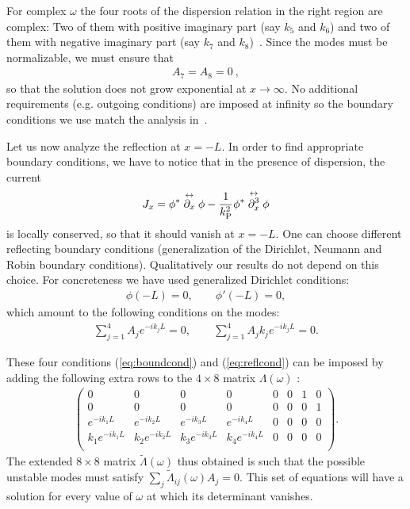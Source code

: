 \documentclass[11pt,a4paper]{article}
\begin{document}
For complex $\omega$ the four roots of the dispersion relation in the right region are complex: Two of them with positive imaginary part (say $k_5$ and $k_6$) and two of them with negative imaginary part (say $k_7$ and $k_8$)~\cite{garay-PRA}. Since the modes must be normalizable, we must ensure that 
\begin{align}
A_7=A_8=0~,
\label{eq:boundcond}
\end{align}
so that the solution does not grow exponential at $x\to\infty$. No additional requirements (e.g. outgoing conditions) are imposed at infinity  so 
the boundary conditions we use match the analysis in~\cite{macher-parentani,garay-PRA,finazzi-parentani2}. 


Let us now analyze the reflection at $x=-L$. In order to find appropriate boundary conditions, we have to notice that in the presence of dispersion, the current
\begin{align}
J_x = \phi^* \stackrel{\leftrightarrow}{\partial_x} \phi -
{1 \over k_\text{P}^2} \phi^* \stackrel{\leftrightarrow}{\partial^3_x} \phi
\end{align}
is locally conserved, so that it should vanish at $x=-L$.  
One can choose different reflecting boundary conditions (generalization of the Dirichlet, Neumann and Robin boundary conditions).
Qualitatively our results do not depend on this choice. For concreteness we have used generalized Dirichlet conditions: 
\begin{align}
\phi(-L)=0,\qquad \phi'(-L)=0,
\end{align}
which amount to the following conditions on the modes:
\begin{align}
\sum_{j=1}^4A_j e^{-ik_jL}=0,
\qquad
\sum_{j=1}^4A_jk_j e^{-ik_jL}=0.
\label{eq:reflcond}
\end{align}

These four conditions (\ref{eq:boundcond}) and (\ref{eq:reflcond}) can be imposed by adding the following extra rows to the $4 \times 8$ matrix $\Lambda(\omega)$ :
\begin{align}
\begin{pmatrix}
0 & 0 &0 &0 &0 &0 & 1&0
\\
0 & 0 &0 &0 &0 &0 & 0&1
\\
e^{-ik_1L} & e^{-ik_2L} & e^{-ik_3L} & e^{-ik_4L} & 0 & 0& 0& 0
\\
k_1e^{-ik_1L} & k_2e^{-ik_2L} & k_3e^{-ik_3L} & k_4e^{-ik_4L} & 0 & 0& 0& 0
\\
\end{pmatrix}.
\label{lambdaext-matrix}
\end{align}
The extended $8\times 8$ matrix $\tilde \Lambda(\omega)$ thus  obtained is such that the possible unstable modes must satisfy $\sum_j \tilde\Lambda_{ij}(\omega)A_j=0$. This set of equations will have a solution for every value of $\omega$ at which its determinant vanishes. 
\end{document}
